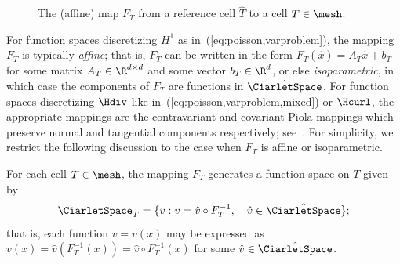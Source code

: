 \begin{figure}
  \center{}
  \caption{The (affine) map $F_T$ from a reference cell $\hat{T}$
    to a cell $T \in \mesh$.}
  \label{fig:kirby-7:affinemap}
\end{figure}

%
For function spaces discretizing $H^1$ as
in~(\ref{eq:poisson,varproblem}), the mapping $F_T$ is typically
\emph{affine}; that is, $F_T$ can be written in the form $F_T(\hat{x})
= A_T \hat{x} + b_T$ for some matrix $A_T \in \R^{d\times d}$ and some
vector $b_T \in \R^d$, or else \emph{isoparametric}, in which case the
components of $F_T$ are functions in $\hat{\CiarletSpace}$. For function
spaces discretizing $\Hdiv$ like
in~(\ref{eq:poisson,varproblem,mixed}) or $\Hcurl$, the appropriate
mappings are the contravariant and covariant Piola mappings which
preserve normal and tangential components respectively;
see~\citet{RognesKirbyLogg2009}. For simplicity, we restrict the
following discussion to the case when $F_T$ is affine or
isoparametric.

For each cell $T \in \mesh$, the mapping $F_T$ generates a
function space on $T$ given by
\begin{equation}
  \CiarletSpace_T = \{ v : v = \hat{v} \circ F_T^{-1}, \quad \hat{v} \in
  \hat{\CiarletSpace} \};
\end{equation}
that is, each function $v = v(x)$ may be expressed as $v(x) =
\hat{v}(F_T^{-1}(x)) = \hat{v} \circ F_T^{-1} (x)$ for some $\hat{v}
\in \hat{\CiarletSpace}$.

